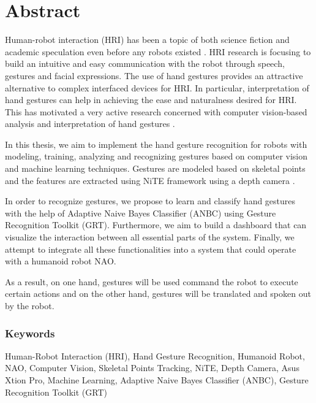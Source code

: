 \chapter*{Abstract} Human-robot interaction (HRI) has been a topic of both science fiction and academic speculation even before any robots existed \cite{1}. HRI research is focusing to build an intuitive and easy communication with the robot through speech, gestures and facial expressions. The use of hand gestures provides an attractive alternative to complex interfaced devices for HRI. In particular, interpretation of hand gestures can help in achieving the ease and naturalness desired for HRI. This has motivated a very active research concerned with computer vision-based analysis and interpretation of hand gestures \cite{2}.

In this thesis, we aim to implement the hand gesture recognition for robots with modeling, training, analyzing and recognizing gestures based on computer vision and machine learning techniques. Gestures are modeled based on skeletal points and the features are extracted using NiTE framework using a depth camera \cite{3}. 

In order to recognize gestures, we propose to learn and classify hand gestures with the help of Adaptive Naive Bayes Classifier (ANBC) using Gesture Recognition Toolkit (GRT). Furthermore, we aim to build a dashboard that can visualize the interaction between all essential parts of the system. Finally, we attempt to integrate all these functionalities into a system that could operate with a humanoid robot NAO.

As a result, on one hand, gestures will be used command the robot to execute certain actions and on the other hand, gestures will be translated and spoken out by the robot. 

\subsection*{Keywords} Human-Robot Interaction (HRI), Hand Gesture Recognition, Humanoid Robot, NAO, Computer Vision, Skeletal Points Tracking, NiTE, Depth Camera, Asus Xtion Pro, Machine Learning, Adaptive Naive Bayes Classifier (ANBC), Gesture Recognition Toolkit (GRT) 
